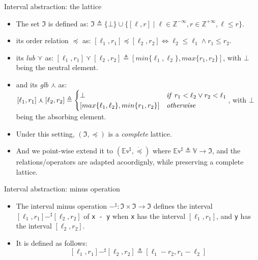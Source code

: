 \documentclass[aspectratio=169]{beamer}
\begin{document}
%
\begin{frame}{Interval abstraction: the lattice}
  \begin{itemize}
  \item The set $\pmb{\mathfrak{I}}$ is defined as:
    \(
      \pmb{\mathfrak{I}} \triangleq \{\bot\} \cup
      \{[\ell,r]\;\pmb{|}\;\ell \in \mathbb{Z}^{-\infty}, r \in
      \mathbb{Z}^{+\infty},\ell \leq r\}.
    \)
  \pause\item its order relation
    $\preccurlyeq$ as:
    \(
      [\ell_1,r_1] \preccurlyeq [\ell_2,r_2] \Leftrightarrow \ell_2 \leq \ell_1 \wedge r_1 \leq r_2.
    \)
  \pause\item its \emph{lub} $\curlyvee$ as:
    \(
      [\ell_1,r_1] \curlyvee [\ell_2,r_2] \triangleq [min\{\ell_1,\ell_2\},max\{r_1,r_2\}]
    \), with $\bot$ being the neutral element.
  \pause\item and its \emph{glb} $\curlywedge$ as:
    \(
      [\ell_1,r_1] \curlywedge [\ell_2,r_2] \triangleq \begin{cases}
        \bot & \text{\textit{if} } r_1 < \ell_2 \vee r_2 < \ell_1\\
        [max\{\ell_1,\ell_2\},min\{r_1,r_2\}] & \text{\emph{otherwise}}
      \end{cases}
    \), with $\bot$ being the absorbing element.
  \pause\item Under this setting,
    $(\pmb{\mathfrak{I}},\preccurlyeq)$ is a \emph{complete}
    lattice.
  \pause\item And we point-wise extend it to
    $(\mathbb{Ev}^\sharp,\dot{\preccurlyeq})$ where
    $\mathbb{Ev}^\sharp \triangleq \mathbb{V} \to
    \pmb{\mathfrak{I}}$, and the relations/operators are adapted
    acoordignly, while preserving a complete lattice.
  \end{itemize}
\end{frame}
%
\begin{frame}{Interval abstraction: minus operation}
  \begin{itemize}
  \item The interval minus operation
    $-^\sharp : \pmb{\mathfrak{I}} \times \pmb{\mathfrak{I}} \to
    \pmb{\mathfrak{I}}$ defines the interval
    $[\ell_1,r_1] -^\sharp [\ell_2,r_2]$ of \texttt{x~-~y} when
    \texttt{x} has the interval $[\ell_1,r_1]$, and \texttt{y} has the
    interval $[\ell_2,r_2]$.
  \pause\item It is defined as follows:
    \[
      [\ell_1,r_1] -^\sharp [\ell_2,r_2] \triangleq [\ell_1 - r_2, r_1 - \ell_2]
    \]
  \end{itemize}
\end{frame}
\end{document}
